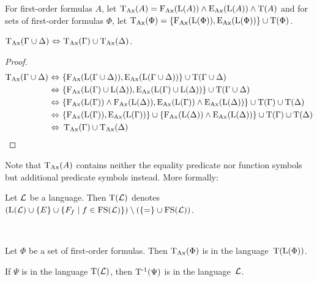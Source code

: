 \begin{defi}
	For first-order formulas $A$, let $\TransAll(A) = \FAX(\Lang(A)) \land \EAX(\Lang(A)) \land \Trans(A)$ and for sets of first-order formulas $\Phi$, let $\TransAll(\Phi) = \{\FAX(\Lang(\Phi)), \EAX(\Lang(\Phi))\} \cup \Trans(\Phi)$.
\end{defi}

\begin{lemma}
	\label{lemma:trans_transform}
	$\TransAll(\Gamma \cup \Delta)\,\liff\,\TransAll(\Gamma) \cup \TransAll(\Delta)$.
\end{lemma}
\begin{proof}
	\begin{align*}
		\TransAll(\Gamma \cup \Delta)\,\liff~&\{\FAX(\Lang(\Gamma\cup\Delta)), \EAX(\Lang(\Gamma \cup\Delta))\} \cup \Trans(\Gamma \cup \Delta) \\
		\liff~&\{\FAX(\Lang(\Gamma)\cup\Lang(\Delta)), \EAX(\Lang(\Gamma)\cup\Lang(\Delta))\} \cup \Trans(\Gamma \cup \Delta) \\
		\liff~&\{\FAX(\Lang(\Gamma)) \land \FAX(\Lang(\Delta)), \EAX(\Lang(\Gamma)) \land \EAX(\Lang(\Delta))\} \cup \Trans(\Gamma) \cup \Trans(\Delta) \\
		\liff~&\{\FAX(\Lang(\Gamma)),\EAX(\Lang(\Gamma))\} \cup \{\FAX(\Lang(\Delta)) \land \EAX(\Lang(\Delta))\} \cup \Trans(\Gamma) \cup \Trans(\Delta) \\
		\liff~&\TransAll(\Gamma) \cup \TransAll(\Delta)
		\qedhere
	\end{align*}
\end{proof}

Note that $\TransAll(A)$ contains neither the equality predicate nor function symbols but additional predicate symbols instead. More formally:


\begin{defi}
	Let $\LangSym$ be a language.
	Then $\Trans(\LangSym)$ denotes $(\Lang(\LangSym)\cup \{E\}\cup\{F_f\mid f \in \FS(\LangSym)\}) \setminus(\{=\nolinebreak \} \cup\nolinebreak \FS(\LangSym))$.
\end{defi}

\begin{lemma}~ 
	\label{lemma:trans_lang}
	\begin{compactenum}
	\item
		Let $\Phi$ be a set of first-order formulas. Then $\TransAll(\Phi)$ is in the language~$\Trans(\Lang(\Phi))$.
		\label{lemma:trans_lang1}

	\item 
		If $\Psi$ is in the language $\Trans(\LangSym)$, then $\TransInv(\Psi)$ is in the language~$\LangSym$.
		\label{lemma:trans_lang2}
	\end{compactenum}
\end{lemma}

